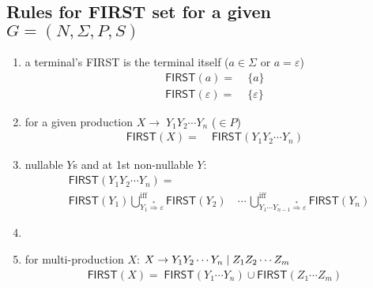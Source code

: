 \documentclass[10pt,a4paper,landscape]{article}
\begin{document}
\pagestyle{empty}
\begin{multicols*}{3}
\section*{Rules for \textsc{FIRST} set for a given $G = (N,\Sigma,P,S)$}
\begin{enumerate}
\item a terminal's \textsf{FIRST} is the terminal itself ($a\in \Sigma$ or $a = \varepsilon$)
  \begin{align*}
    \mathsf{FIRST}(a)           =&\; \{a\}           \tag{1.1}\\
    \mathsf{FIRST}(\varepsilon) =&\; \{\varepsilon\} \tag{1.2}
  \end{align*}
\item for a given production $X \to\; Y_1Y_2\cdots Y_n$ ($\in P$)
  \begin{align*}
    \mathsf{FIRST}(X) =&\; \mathsf{FIRST}(Y_1Y_2\cdots Y_n) \tag{2}
  \end{align*}
\item {} nullable $Y$s and  at 1st non-nullable $Y$:
  \begin{align*}
    & \mathsf{FIRST}(Y_1Y_2\cdots Y_n) = \nonumber\\
    & \mathsf{FIRST}(Y_1)
\bigcup_{Y_1\overset{*}{\Rightarrow}\varepsilon}^{\text{iff}} \mathsf{FIRST}(Y_2) \quad\cdots\, \bigcup_{Y_1\cdots Y_{n-1}\overset{*}{\Rightarrow}\varepsilon}^{\text{iff}} \mathsf{FIRST}(Y_n) \tag{3}
  \end{align*}
\item[]
\item for multi-production $X$: $X\to Y_1Y_2\cdots Y_n \;|\; Z_1Z_2\cdots Z_m$
  \begin{align*}
\mathsf{FIRST}(X) =\; \mathsf{FIRST}(Y_1\cdots Y_n) \cup \mathsf{FIRST}(Z_1\cdots Z_m) \tag{4}
  \end{align*}
\end{enumerate}

\end{multicols*}
\end{document}
